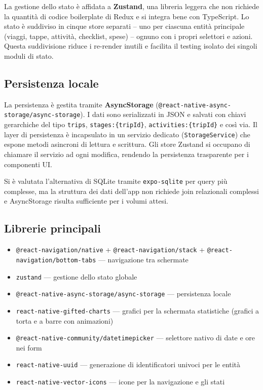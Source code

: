 \documentclass[12pt, a4paper]{article}
\begin{document}
La gestione dello stato è affidata a \textbf{Zustand}, una libreria leggera che non
richiede la quantità di codice boilerplate di Redux e si integra bene con TypeScript.
Lo stato è suddiviso in cinque store separati -- uno per ciascuna entità principale
(viaggi, tappe, attività, checklist, spese) -- ognuno con i propri selettori e azioni.
Questa suddivisione riduce i re-render inutili e facilita il testing isolato dei singoli
moduli di stato.

\subsection{Persistenza locale}

La persistenza è gestita tramite \textbf{AsyncStorage} (\texttt{@react-native-async-storage/async-storage}).
I dati sono serializzati in JSON e salvati con chiavi gerarchiche del tipo
\texttt{trips}, \texttt{stages:\{tripId\}}, \texttt{activities:\{tripId\}} e così via.
Il layer di persistenza è incapsulato in un servizio dedicato (\texttt{StorageService})
che espone metodi asincroni di lettura e scrittura. Gli store Zustand si occupano di
chiamare il servizio ad ogni modifica, rendendo la persistenza trasparente per i
componenti UI.

Si è valutata l'alternativa di SQLite tramite \texttt{expo-sqlite} per query più
complesse, ma la struttura dei dati dell'app non richiede join relazionali complessi
e AsyncStorage risulta sufficiente per i volumi attesi.

\subsection{Librerie principali}

\begin{itemize}[leftmargin=1.5em, itemsep=3pt]
  \item \texttt{@react-navigation/native} + \texttt{@react-navigation/stack} +
    \texttt{@react-navigation/bottom-tabs} --- navigazione tra schermate
  \item \texttt{zustand} --- gestione dello stato globale
  \item \texttt{@react-native-async-storage/async-storage} --- persistenza locale
  \item \texttt{react-native-gifted-charts} --- grafici per la schermata statistiche
    (grafici a torta e a barre con animazioni)
  \item \texttt{@react-native-community/datetimepicker} --- selettore nativo di
    date e ore nei form
  \item \texttt{react-native-uuid} --- generazione di identificatori univoci per le entità
  \item \texttt{react-native-vector-icons} --- icone per la navigazione e gli stati
\end{itemize}
\end{document}
